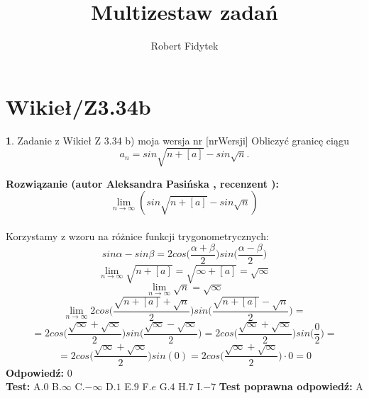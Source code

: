 \documentclass[12pt, a4paper]{article}
\title{Multizestaw zadań}
\author{Robert Fidytek}
\date{}
\theoremstyle{definition} %
\newtheorem{zad}{}
\newcommand{\kategoria}[1]{\section{#1}} %
\newcommand{\zadStart}[1]{\begin{zad}#1\newline} %
\newcommand{\zadStop}{\end{zad}}   %
\newcommand{\rozwStart}[2]{\noindent \textbf{Rozwiązanie (autor #1 , recenzent #2): }\newline} %
\newcommand{\rozwStop}{\newline}                                            %
\newcommand{\odpStart}{\noindent \textbf{Odpowiedź:}\newline}    %
\newcommand{\odpStop}{\newline}                                             %
\newcommand{\testStart}{\noindent \textbf{Test:}\newline} %
\newcommand{\testStop}{\newline} %
\newcommand{\kluczStart}{\noindent \textbf{Test poprawna odpowiedź:}\newline} %
\newcommand{\kluczStop}{\newline} %
\begin{document}
\maketitle


\kategoria{Wikieł/Z3.34b}
\zadStart{Zadanie z Wikieł Z 3.34 b) moja wersja nr [nrWersji]}
Obliczyć granicę ciągu $$a_n=sin\sqrt{n+[a]}-sin\sqrt{n}.$$
\zadStop
\rozwStart{Aleksandra Pasińska}{}
$$\lim_{n\rightarrow \infty}(sin\sqrt{n+[a]}-sin\sqrt{n})$$\\
Korzystamy z wzoru na różnice funkcji trygonometrycznych:
$$sin\alpha-sin\beta=2cos\bigg(\frac{\alpha+\beta}{2}\bigg)sin\bigg(\frac{\alpha-\beta}{2}\bigg)$$
$$\lim_{n\rightarrow \infty}\sqrt{n+[a]}=\sqrt{\infty+[a]}=\sqrt{\infty}$$
$$\lim_{n\rightarrow \infty}\sqrt{n}=\sqrt{\infty}$$
$$\lim_{n\rightarrow \infty}2cos\bigg(\frac{\sqrt{n+[a]}+\sqrt{n}}{2}\bigg)sin\bigg(\frac{\sqrt{n+[a]}-\sqrt{n}}{2}\bigg)=$$
$$=2cos\bigg(\frac{\sqrt{\infty}+\sqrt{\infty}}{2}\bigg)sin\bigg(\frac{\sqrt{\infty}-\sqrt{\infty}}{2}\bigg)=2cos\bigg(\frac{\sqrt{\infty}+\sqrt{\infty}}{2}\bigg)sin\bigg(\frac{0}{2}\bigg)=$$
$$=2cos\bigg(\frac{\sqrt{\infty}+\sqrt{\infty}}{2}\bigg)sin(0)=2cos\bigg(\frac{\sqrt{\infty}+\sqrt{\infty}}{2}\bigg)\cdot 0=0$$
\rozwStop
\odpStart
$0$\\
\odpStop
\testStart
A.$0$
B.$\infty$
C.$-\infty$
D.$1$
E.$9$
F.$e$
G.$4$
H.$7$
I.$-7$
\testStop
\kluczStart
A
\kluczStop
\end{document}
